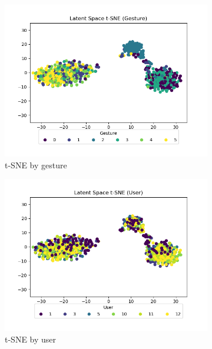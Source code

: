 \begin{figure}
	\centering
	\begin{subfigure}{0.3\textwidth}
		\centering
		\includegraphics[width=\textwidth]{figures/extended/long_ls_gesture}
		\caption{t-SNE by gesture}
		\label{fig:extended-ls-gesture}
	\end{subfigure}
	\hfill
	\begin{subfigure}{0.3\textwidth}
		\centering
		\includegraphics[width=\textwidth]{figures/extended/long_ls_user}
		\caption{t-SNE by user}
		\label{fig:extended-ls-user}
	\end{subfigure}
	\hfill
	\begin{subfigure}{0.3\textwidth}
		\centering

\end{subfigure}
\end{figure}
